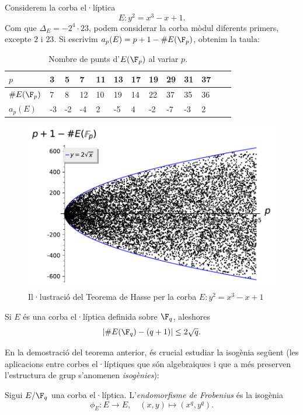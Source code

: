 \begin{example}
Considerem la corba el·líptica
\[
E\colon y^2=x^3-x+1.
\]
Com que $\Delta_E = - 2^4\cdot 23$, podem considerar la corba mòdul diferents primers, excepte $2$ i $23$. Si escrivim $a_p(E)=p+1-\#E(\F_p)$, obtenim la taula:
\begin{table}[ht]
\centering
    \begin{tabular}{lllllllllllll}
\toprule
      $p$&3&5&7&11&13&17&19&29&31&37  \\
\midrule
      $\#E(\F_p)$&7&8&12&10&19&14&22&37&35&36\\
    $a_p(E)$&-3&-2&-4&2&-5&4&-2&-7&-3&2\\
    \bottomrule
    \end{tabular}
\caption{Nombre de punts d'$E(\F_p)$ al variar $p$.}
    \end{table}
\begin{figure}[ht!]
\centering
\includegraphics[height=.3\textheight]{pointcounts.pdf}
\caption{Il·lustració del Teorema de Hasse per la corba $E\colon y^2=x^3-x+1$}
\end{figure}
\end{example}

\begin{theorem}
 Si $E$ és una corba el·líptica definida sobre $\F_q$, aleshores
 \[
 |\# E(\F_q) - (q+1)|\leq 2\sqrt{q}.
 \]
\end{theorem}

En la demostració del teorema anterior, és crucial estudiar la isogènia següent (les aplicacions entre corbes el·líptiques que són algebraiques i que a més preserven l'estructura de grup s'anomenen \emph{isogènies}):

\begin{definition}
Sigui $E/\F_q$ una corba el·líptica. L'\emph{endomorfisme de Frobenius} és la isogènia
\[
\phi_E\colon E\to E,\quad (x,y)\mapsto(x^q,y^q).
\]
\end{definition}

